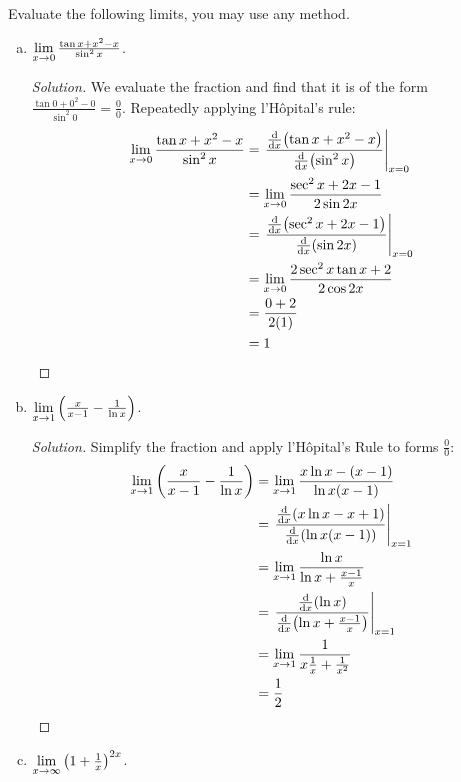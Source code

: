 \documentclass{agony}
\begin{document}
\question Evaluate the following limits, you may use any method.
\begin{enumerate}[(a)]
  \item $\lim\limits_{x\to0}\frac{\tan x + x^2 - x}{\sin^2 x}$.
        \begin{proof}[Solution]
          We evaluate the fraction and find that it is of the form
          $\frac{\tan 0+0^2-0}{\sin^2 0}=\frac{0}{0}$.
          Repeatedly applying l'Hôpital's rule:
          \begin{align*}
            \lim_{x\to0} \frac{\tan x + x^2 - x}{\sin^2 x}
             & = \left.\frac{\dv{x}(\tan x + x^2 - x)}{\dv{x}(\sin^2 x)}\right|_{x=0} \\
             & = \lim_{x\to0} \frac{\sec^2 x + 2x - 1}{2\sin 2x}             \\
             & = \left.\frac{\dv{x}(\sec^2 x + 2x - 1)}{\dv{x}(\sin 2x)}\right|_{x=0} \\
             & = \lim_{x\to0} \frac{2\sec^2 x \tan x + 2}{2\cos 2x}          \\
             & = \frac{0 + 2}{2(1)}                                          \\
             & = 1 \qedhere
          \end{align*}
        \end{proof}
  \item $\lim\limits_{x\to1}\left(\frac{x}{x-1} - \frac{1}{\ln x}\right)$.
        \begin{proof}[Solution]
          Simplify the fraction and apply l'Hôpital's Rule to forms $\frac{0}{0}$:
          \begin{align*}
            \lim_{x\to1} \left(\frac{x}{x-1} - \frac{1}{\ln x}\right)
             & = \lim_{x\to1} \frac{x \ln x - (x-1)}{\ln x(x-1)}               \\
             & = \left.\frac{\dv{x}(x \ln x - x+1)}{\dv{x}(\ln x(x-1))}\right|_{x=1}    \\
             & = \lim_{x\to1} \frac{\ln x}{\ln x + \frac{x-1}{x}}              \\
             & = \left.\frac{\dv{x}(\ln x)}{\dv{x}(\ln x + \frac{x-1}{x})}\right|_{x=1} \\
             & = \lim_{x\to1} \frac{1}{x\frac{1}{x} + \frac{1}{x^2}}           \\
             & = \frac{1}{2} \qedhere
          \end{align*}
        \end{proof}
  \item $\lim\limits_{x\to\infty}\left(1 + \frac{1}{x}\right)^{2x}$.

\end{enumerate}
\end{document}
